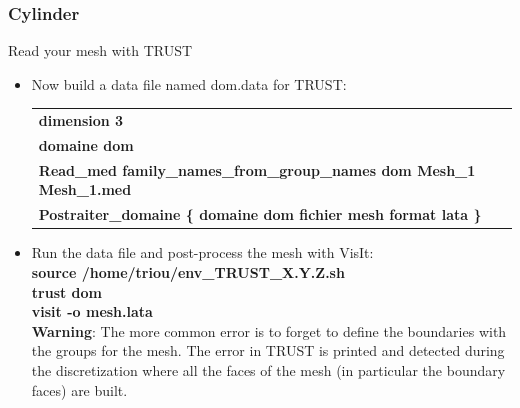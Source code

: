 \documentclass[10pt, hyperref={unicode=true,pdfusetitle, bookmarks=true,bookmarksnumbered=false,bookmarksopen=false, breaklinks=false,pdfborder={0 0 1},backref=true,colorlinks=true,linkcolor=darkblue,pageanchor}]{beamer}
\begin{document}
\begin{frame}
\frametitle{Cylinder}
\begin{block}{Read your mesh with TRUST}

\begin{itemize}
\item \label{read_mesh} Now build a data file named dom.data for TRUST:\\
\vspace{0.2cm}
\begin{tabular}{|l|}
\hline 
\textbf{dimension 3 }\tabularnewline
\textbf{domaine dom }\tabularnewline
\textbf{Read\_med family\_names\_from\_group\_names dom Mesh\_1 Mesh\_1.med }\tabularnewline
\textbf{Postraiter\_domaine\index{Postraiter\_domaine} \{ domaine dom fichier mesh format lata\index{format lata}
\}}\tabularnewline
\hline 
\end{tabular}

\item Run the data file and post-process the mesh with VisIt:\\
\textbf{source  /home/triou/env\_TRUST\_X.Y.Z.sh} \\
\textbf{trust dom} \\
\textbf{visit -o mesh.lata} \\
\vspace{0.2cm}
\textbf{Warning}: The more common error is to forget to define the boundaries with the groups for the mesh. The error in TRUST is printed and detected during the discretization where all the faces of the mesh (in particular the boundary faces) are built.

\end{itemize}

\end{block}
\end{frame}
\end{document}
